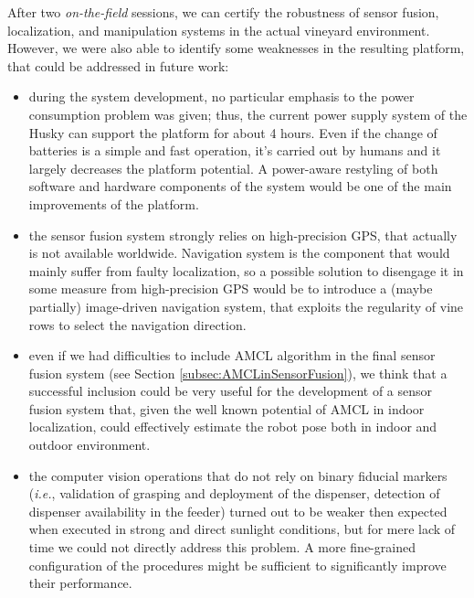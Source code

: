 After two \textit{on-the-field} sessions, we can certify the robustness of sensor fusion, localization, and manipulation systems in the actual vineyard environment. However, we were also able to identify some weaknesses in the resulting platform, that could be addressed in future work:
\begin{itemize}
	\item during the system development, no particular emphasis to the power consumption problem was given; thus, the current power supply system of the Husky can support the platform for about 4 hours. Even if the change of batteries is a simple and fast operation, it's carried out by humans and it largely decreases the platform potential. A power-aware restyling of both software and hardware components of the system would be one of the main improvements of the platform.
	\item the sensor fusion system strongly relies on high-precision GPS, that actually is not available worldwide. Navigation system is the component that would mainly suffer from faulty localization, so a possible solution to disengage it in some measure from high-precision GPS would be to introduce a (maybe partially) image-driven navigation system, that exploits the regularity of vine rows to select the navigation direction.
	\item even if we had difficulties to include \ac{AMCL} algorithm in the final sensor fusion system (see Section \ref{subsec:AMCLinSensorFusion}), we think that a successful inclusion could be very useful for the development of a sensor fusion system that, given the well known potential of \ac{AMCL} in indoor localization, could effectively estimate the robot pose both in indoor and outdoor environment.
	\item the computer vision operations that do not rely on binary fiducial markers (\textit{i.e.}, validation of grasping and deployment of the dispenser, detection of dispenser availability in the feeder) turned out to be weaker then expected when executed in strong and direct sunlight conditions, but for mere lack of time we could not directly address this problem. A more fine-grained configuration of the procedures might be sufficient to significantly improve their performance.
\end{itemize}





